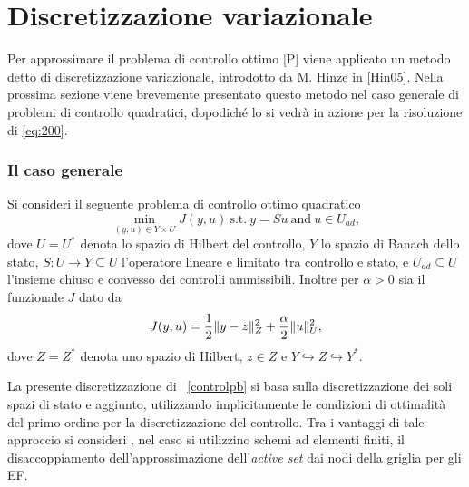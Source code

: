 \chapter{Discretizzazione variazionale}
\label{chap:DiscVar}
Per approssimare il problema di controllo ottimo [P] viene applicato un metodo detto di discretizzazione variazionale, introdotto da M. Hinze in [Hin05]. Nella prossima sezione viene brevemente presentato questo metodo nel caso generale di problemi di controllo quadratici, dopodiché lo si vedrà in azione per  la risoluzione di \ref{eq:200}.   


\subsection{Il caso generale}

Si consideri il seguente problema di controllo ottimo quadratico
\begin{equation}
\label{controlpb}
\min_{(y,u)\in Y\times U} J(y,u)   \ \text{s.t.} \ y=Su \  \text{and} \ u\in U_{ad},
\end{equation}
dove $ U=U^*$ denota lo spazio di Hilbert del controllo, $ Y $ lo spazio di Banach dello stato, $ S:U\to Y\subseteq U $ l'operatore lineare e limitato tra controllo e stato, e $ U_{ad}\subseteq U $ l'insieme chiuso e convesso dei controlli ammissibili. Inoltre per $ \alpha>0 $ sia il funzionale $ J $ dato da 
\begin{equation}
J(y,u)=\frac{1}{2}\lVert y-z\rVert^2_Z + \frac{\alpha}{2}\lVert u\rVert^2_U,
\end{equation}
dove $ Z=Z^* $ denota uno spazio di Hilbert, $ z\in Z $ e $ Y\hookrightarrow Z\hookrightarrow Y^* $.   

La presente  discretizzazione di ~\eqref{controlpb} si basa sulla discretizzazione dei soli spazi di stato e aggiunto, utilizzando implicitamente le condizioni di ottimalità del primo ordine per la discretizzazione del controllo. Tra i vantaggi di tale approccio si consideri , nel caso si utilizzino schemi ad elementi finiti,  il disaccoppiamento dell'approssimazione dell'\textit{active set} dai nodi della griglia per gli EF. 

